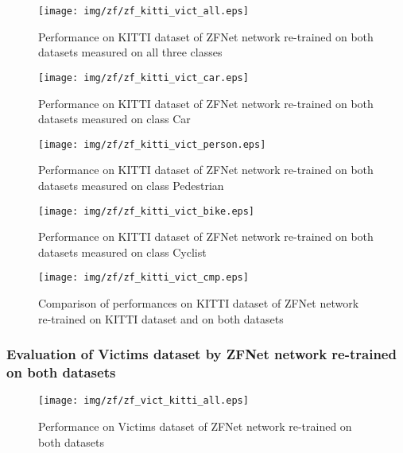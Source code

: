\begin{figure}[!]
\texttt{[image: img/zf/zf\_kitti\_vict\_all.eps]}
\caption[Performance of ZFNet network on KITTI+Victims dataset]{Performance on KITTI dataset of ZFNet network re-trained on both datasets measured on all three classes}
\label{zfkittivall}
\end{figure}

\begin{figure}[!]
\texttt{[image: img/zf/zf\_kitti\_vict\_car.eps]}
\caption[Performance of ZFNet network on KITTI+Victims dataset, class Car]{Performance on KITTI dataset of ZFNet network re-trained on both datasets measured on class Car}
\label{zfkittivc}
\end{figure}

\begin{figure}[!]
\texttt{[image: img/zf/zf\_kitti\_vict\_person.eps]}
\caption[Performance of ZFNet network on KITTI+Victims dataset, class Pedestrian]{Performance on KITTI dataset of ZFNet network re-trained on both datasets measured on class Pedestrian}
\label{zfkittivp}
\end{figure}

\begin{figure}[!]
\texttt{[image: img/zf/zf\_kitti\_vict\_bike.eps]}
\caption[Performance of ZFNet network on KITTI+Victims dataset, class Cyclist]{Performance on KITTI dataset of ZFNet network re-trained on both datasets measured on class Cyclist}
\label{zfkittivb}
\end{figure}
\clearpage
\begin{figure}[!]
\texttt{[image: img/zf/zf\_kitti\_vict\_cmp.eps]}
\caption[Comparison of performances of ZFNet networks, KITTI dataset]{Comparison of performances on KITTI dataset of ZFNet network re-trained on KITTI dataset and on both datasets}
\label{zfkittivcmp}
\end{figure}
\subsubsection{Evaluation of Victims dataset by ZFNet network re-trained on both datasets}

\begin{figure}[!]
\texttt{[image: img/zf/zf\_vict\_kitti\_all.eps]}
\caption[Performance of ZFNet network on Victims+KITTI dataset]{Performance on Victims dataset of ZFNet network re-trained on both datasets}
\label{zfvkall}
\end{figure}

